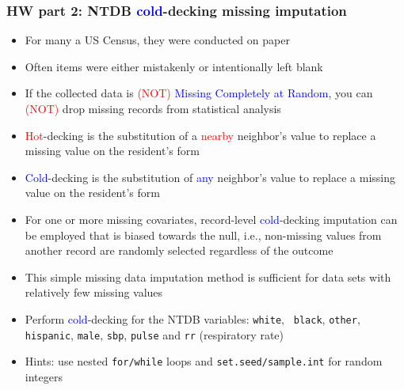 \documentclass[11pt,pdftex,dvipsnames,usenames,helvetica]{beamer}
\newcommand*{\red}[1]{\textcolor{red}{#1}}
\newcommand*{\blue}[1]{\textcolor{blue}{#1}}
\begin{document}
\begin{frame}[fragile]
\frametitle{HW part 2: NTDB \blue{cold}-decking missing imputation}

\begin{itemize}
\item For many a US Census, they were conducted on paper
\item Often items were either mistakenly or intentionally left blank
\item If the collected data is \textcolor{red}{(NOT)}
  \textcolor{blue}{Missing Completely at Random}, you can
  \textcolor{red}{(NOT)} drop missing records from statistical
  analysis
\item \red{Hot}-decking is the substitution of a \red{nearby} neighbor's
  value to replace a missing value on the resident's form
\item \blue{Cold}-decking is the substitution of \blue{any} neighbor's
  value to replace a missing value on the resident's form
\item For one or more missing covariates, record-level \blue{cold}-decking
  imputation can be employed that
  is biased towards the null, i.e., non-missing values from another
  record are randomly selected regardless of the outcome
\item This simple
  missing data imputation method is sufficient for data sets with
  relatively few missing values 
\item Perform \blue{cold}-decking for the NTDB variables: {\tt white}, {\tt
    black}, {\tt other}, {\tt hispanic}, {\tt male}, {\tt sbp},
{\tt pulse} and {\tt rr} (respiratory rate) 
\item Hints: use nested {\tt for/while} loops and 
{\tt set.seed/sample.int} for random integers
\end{itemize}

\end{frame}
\end{document}
